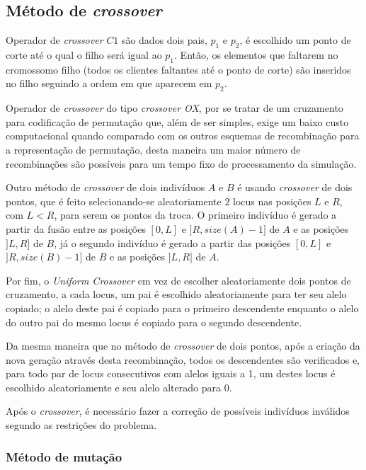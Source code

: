 \documentclass[12pt,a4paper]{article}
\begin{document}
    \subsection{Método de \textit{crossover}}

        Operador de \textit{crossover} $C1$ são dados dois pais, $p_1$ e $p_2$, é escolhido um ponto de corte até o qual o filho será igual ao $p_1$. Então, os elementos que faltarem no
        cromossomo filho (todos os clientes faltantes até o ponto de corte) são inseridos no filho seguindo a ordem em que aparecem em $p_2$. 

        Operador de \textit{crossover} do tipo \emph{crossover OX}, por se tratar de um cruzamento para codificação de permutação que, além de ser simples, exige um baixo custo computacional
        quando comparado com os outros esquemas de recombinação para a representação de permutação, desta maneira um maior número de recombinações são possíveis para um tempo fixo de processamento
        da simulação. 

        Outro método de \textit{crossover} de dois indivíduos $A$ e $B$ é usando \textit{crossover} de dois pontos, que é feito selecionando-se aleatoriamente $2$ locus nas posições $L$ e $R$,
        com $L < R$, para serem os pontos da troca.  O primeiro indivíduo é gerado a partir da fusão entre as posições $[0, L]$ e $]R, size(A) - 1]$ de $A$ e as posições $]L, R]$ de $B$, já
        o segundo indivíduo é gerado a partir das posições $[0, L]$ e $]R, size(B) - 1]$ de $B$ e as posições $]L, R]$ de $A$.

        Por fim, o \textit{Uniform Crossover} em vez de escolher aleatoriamente dois pontos de cruzamento, a cada locus, um pai é escolhido aleatoriamente para ter seu alelo copiado; o alelo
        deste pai é copiado para o primeiro descendente enquanto o alelo do outro pai do mesmo locus é copiado para o segundo descendente.

        Da mesma maneira que no método de \textit{crossover} de dois pontos, após a criação da nova geração através desta recombinação, todos os descendentes são verificados e, para todo par de locus
        consecutivos com alelos iguais a 1, um destes locus é escolhido aleatoriamente e seu alelo alterado para 0.

        Após o \textit{crossover}, é necessário fazer a correção de possíveis indivíduos inválidos segundo as restrições do problema.

    \subsubsection{Método de mutação}
\end{document}
